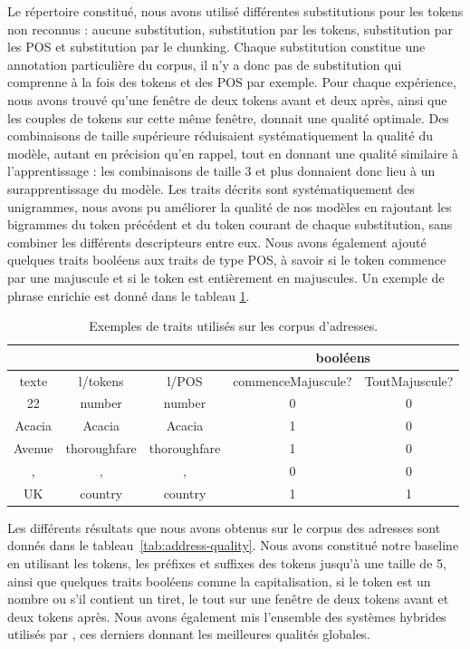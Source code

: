 \documentclass[12pt,a4paper,times,twoside,openright]{report}
\begin{document}
Le répertoire constitué, nous avons utilisé différentes substitutions pour les tokens non reconnus : aucune substitution, substitution par les tokens, substitution par les POS et substitution par le chunking. Chaque substitution constitue une annotation particulière du corpus, il n'y a donc pas de substitution qui comprenne à la fois des tokens et des POS par exemple. Pour chaque expérience, nous avons trouvé qu'une fenêtre de deux tokens avant et deux après, ainsi que les couples de tokens sur cette même fenêtre, donnait une qualité optimale. Des combinaisons de taille supérieure réduisaient systématiquement la qualité du modèle, autant en précision qu'en rappel, tout en donnant une qualité similaire à l'apprentissage : les combinaisons de taille 3 et plus donnaient donc lieu à un surapprentissage du modèle. Les traits décrits sont systématiquement des unigrammes, nous avons pu améliorer la qualité de nos modèles en rajoutant les bigrammes du token précédent et du token courant de chaque substitution, sans combiner les différents descripteurs entre eux. Nous avons également ajouté quelques traits booléens aux traits de type POS, à savoir si le token commence par une majuscule et si le token est entièrement en majuscules. Un exemple de phrase enrichie est donné dans le tableau \ref{tab:address-feature-example}.

\begin{table}[ht!]
\centering
\begin{tabular}{|c|cccc|}
\cline{4-5}
\multicolumn{1}{c}{} & & & \multicolumn{2}{|c|}{booléens} \\
\hline
texte  & l/tokens & l/POS & commenceMajuscule? & ToutMajuscule? \\
\hline
22     & number & number & 0 & 0 \\
Acacia & Acacia & Acacia & 1 & 0 \\
Avenue & thoroughfare & thoroughfare & 1 & 0 \\
,      & , & , & 0 & 0 \\
UK     & country & country & 1 & 1 \\
\hline
\end{tabular}
\caption{Exemples de traits utilisés sur les corpus d'adresses.}
\label{tab:address-feature-example}
\end{table}

Les différents résultats que nous avons obtenus sur le corpus des adresses sont donnés dans le tableau\ \ref{tab:address-quality}. Nous avons constitué notre baseline en utilisant les tokens, les préfixes et suffixes des tokens jusqu'à une taille de 5, ainsi que quelques traits booléens comme la capitalisation, si le token est un nombre ou s'il contient un tiret, le tout sur une fenêtre de deux tokens avant et deux tokens après. Nous avons également mis l'ensemble des systèmes hybrides utilisés par \citet{yu2007high}, ces derniers donnant les meilleures qualités globales.
\end{document}
